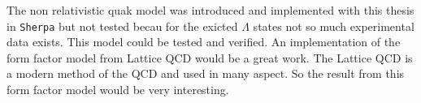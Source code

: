 
\par
The non relativistic quak model \cite{NRQM} was introduced and implemented with 
this thesis in \texttt{Sherpa} but not tested becau for the exicted \(\Lambda\) states 
 not so much experimental data exists. This model could be tested and verified.
An implementation of the form factor model from Lattice QCD \cite{Lattice_QCD} would be a great work. 
The Lattice QCD is a modern method of the QCD and used in many aspect. So 
the result from this form factor model would be very interesting.
